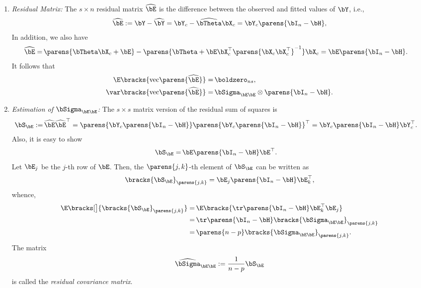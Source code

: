 \documentclass[12pt]{article}
\begin{document}
\begin{enumerate}[label=\textbf{\arabic*.}]
\begin{enumerate}
		\item \textit{Residual Matrix:} The $s \times n$ residual matrix $\widehat{\bE}$ is the difference between the observed and fitted values of $\bY$, i.e., 
		\begin{align*}
			\widehat{\bE} := \bY - \widehat{\bY} = \bY_c - \widehat{\bTheta} \bX_c = \bY_c \parens{\bI_n - \bH}, 
		\end{align*}
		In addition, we also have 
		\begin{align*}
			\widehat{\bE} = & \, \parens{\bTheta \bX_c + \bE} - \parens{\bTheta + \bE \bX_c^{\top} \parens{\bX_c \bX_c^\top }^{-1}} \bX_c 
			= \bE \parens{\bI_n - \bH}. 
		\end{align*}
		It follows that 
		\begin{align*}
			\E \bracks{ \mathrm{vec} \parens{\widehat{\bE}}} = & \, \boldzero_{ns}, \\ 
			\var \bracks{ \mathrm{vec} \parens{\widehat{\bE}}} = & \, \bSigma_{\bE \bE} \otimes \parens{\bI_n - \bH}. 
		\end{align*}
		
		\item \textit{Estimation of $\bSigma_{\bE \bE}$:} The $s \times s$ matrix version of the residual sum of squares is 
		\begin{align*}
			\bS_{\bE} := & \, \widehat{\bE} \widehat{\bE}^\top = \parens{\bY_c \parens{\bI_n - \bH}} \parens{\bY_c \parens{\bI_n - \bH}}^\top 
			= \bY_c \parens{\bI_n - \bH} \bY_c^\top. 
		\end{align*}
		Also, it is easy to show 
		\begin{align*}
			\bS_{\bE} = & \, \bE \parens{\bI_n - \bH} \bE^\top. 
		\end{align*}
		Let $\bE_j$ be the $j$-th row of $\bE$. Then, the $\parens{j,k}$-th element of $\bS_{\bE}$ can be written as 
		\begin{align*}
			\bracks{\bS_{\bE}}_{\parens{j, k}} = \bE_j \parens{\bI_n - \bH} \bE_{k}^\top, 
		\end{align*}
		whence, 
		\begin{align*}
			\E \bracks[\big]{\bracks{\bS_{\bE}}_{\parens{j, k}}} = & \, \E \bracks{\tr \parens{\bI_n - \bH} \bE_k^\top \bE_j} \nonumber \\ 
			= & \, \tr \parens{\bI_n - \bH} \bracks{\bSigma_{\bE \bE}}_{\parens{j, k}} \nonumber \\ 
			= & \, \parens{n - p} \bracks{\bSigma_{\bE \bE}}_{\parens{j, k}}. 
		\end{align*}
		The matrix 
		\begin{align*}
			\widehat{\bSigma}_{\bE \bE} := \frac{1}{n-p} \bS_{\bE}
		\end{align*}
		is called the \emph{residual covariance matrix}. 
		

\end{enumerate}
\end{enumerate}
\end{document}
